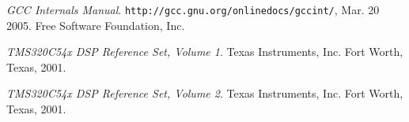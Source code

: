 \documentclass{article}
\begin{document}
\begin{thebibliography}{99}
 \emph{GCC Internals Manual}.
\texttt{http://gcc.gnu.org/onlinedocs/gccint/}, Mar. 20 2005. Free Software
Foundation, Inc.

 \emph{TMS320C54x DSP Reference Set, Volume 1}. Texas
Instruments, Inc. Fort Worth, Texas, 2001.

 \emph{TMS320C54x DSP Reference Set, Volume 2}. Texas
Instruments, Inc. Fort Worth, Texas, 2001.

\end{thebibliography}
\end{document}
